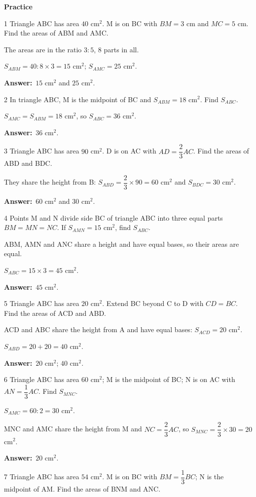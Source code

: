 \documentclass[11pt]{article}
\newif\ifsol \solfalse
\providecommand{\AnsWord}{Đáp số}
\newcommand{\dapso}[1]{\par\textbf{\AnsWord:}\ #1}
\newcommand{\probsol}[1]{%
  \begin{lrbox}{\solmeasure}\begin{minipage}{\dimexpr\linewidth-24pt\relax}#1\end{minipage}\end{lrbox}%
  \ifsol
    \begin{solbox}#1\end{solbox}%
  \else
    \setlength{\solht}{\dimexpr\ht\solmeasure+\dp\solmeasure+0.85cm\relax}%
    \ifdim\solht<1.35cm\setlength{\solht}{1.35cm}\fi
    \begin{tcolorbox}[colback=white,colframe=Line,boxrule=0.8pt,arc=5pt,
      left=8pt,right=8pt,top=4pt,bottom=4pt,height=\solht]{\footnotesize\color{Slate}\itshape\WorkWord}\end{tcolorbox}%
  \fi}
\newcommand{\dividerbar}[1]{\par\vspace{0.6em}\noindent
  \begin{tcolorbox}[enhanced,frame hidden,interior hidden,borderline west={5pt}{0pt}{ProbBlue},
    colback=white,left=12pt,right=12pt,top=5pt,bottom=5pt,arc=4pt]
  {\large\bfseries\color{ProbBlue} #1}\end{tcolorbox}\vspace{0.4em}}
\newcommand{\gap}{\vspace{0.3cm}}
\def\WorkWord{Your work:}
\def\AnsWord{Answer}
\begin{document}
\dividerbar{Practice}
\begin{probbox}{1}{\relax}
Triangle ABC has area $40$ cm$^2$. M is on BC with $BM=3$ cm and $MC=5$ cm. Find the areas of ABM and AMC.
\end{probbox}
\probsol{
The areas are in the ratio $3:5$, $8$ parts in all.\par $S_{ABM}=40:8\times3=15$ cm$^2$; $S_{AMC}=25$ cm$^2$.
\dapso{$15$ cm$^2$ and $25$ cm$^2$.}}
\gap
\begin{probbox}{2}{\relax}
In triangle ABC, M is the midpoint of BC and $S_{ABM}=18$ cm$^2$. Find $S_{ABC}$.
\end{probbox}
\probsol{
$S_{AMC}=S_{ABM}=18$ cm$^2$, so $S_{ABC}=36$ cm$^2$.
\dapso{$36$ cm$^2$.}}
\gap
\begin{probbox}{3}{\relax}
Triangle ABC has area $90$ cm$^2$. D is on AC with $AD=\dfrac23AC$. Find the areas of ABD and BDC.
\end{probbox}
\probsol{
They share the height from B: $S_{ABD}=\dfrac23\times90=60$ cm$^2$ and $S_{BDC}=30$ cm$^2$.
\dapso{$60$ cm$^2$ and $30$ cm$^2$.}}
\gap
\begin{probbox}{4}{\relax}
Points M and N divide side BC of triangle ABC into three equal parts $BM=MN=NC$. If $S_{AMN}=15$ cm$^2$, find $S_{ABC}$.
\end{probbox}
\probsol{
ABM, AMN and ANC share a height and have equal bases, so their areas are equal.\par $S_{ABC}=15\times3=45$ cm$^2$.
\dapso{$45$ cm$^2$.}}
\gap
\begin{probbox}{5}{\relax}
Triangle ABC has area $20$ cm$^2$. Extend BC beyond C to D with $CD=BC$. Find the areas of ACD and ABD.
\end{probbox}
\probsol{
ACD and ABC share the height from A and have equal bases: $S_{ACD}=20$ cm$^2$.\par $S_{ABD}=20+20=40$ cm$^2$.
\dapso{$20$ cm$^2$; $40$ cm$^2$.}}
\gap
\begin{probbox}{6}{\relax}
Triangle ABC has area $60$ cm$^2$; M is the midpoint of BC; N is on AC with $AN=\dfrac13AC$. Find $S_{MNC}$.
\end{probbox}
\probsol{
$S_{AMC}=60:2=30$ cm$^2$.\par MNC and AMC share the height from M and $NC=\dfrac23AC$, so $S_{MNC}=\dfrac23\times30=20$ cm$^2$.
\dapso{$20$ cm$^2$.}}
\gap
\begin{probbox}{7}{\relax}
Triangle ABC has area $54$ cm$^2$. M is on BC with $BM=\dfrac13BC$; N is the midpoint of AM. Find the areas of BNM and ANC.
\end{probbox}
\end{document}
